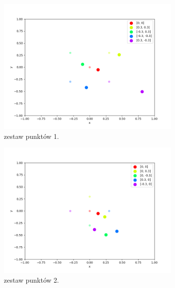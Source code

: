 \begin{figure}[h]
\centering
\begin{subfigure}{.5\textwidth}
    \centering
    \includegraphics[width=\linewidth]{pics/mult_lat_2d/positions_1_mean.png}
\caption{zestaw punktów 1.}
\label{pic:2d_1_mult}
\end{subfigure}%
\begin{subfigure}{.5\textwidth}
    \centering
    \includegraphics[width=\linewidth]{pics/mult_lat_2d/positions_2_mean.png}
\caption{zestaw punktów 2.}
\label{pic:2d_2_mult}
\end{subfigure}
\begin{subfigure}{.5\textwidth}
    \centering

\end{subfigure}
\end{figure}
